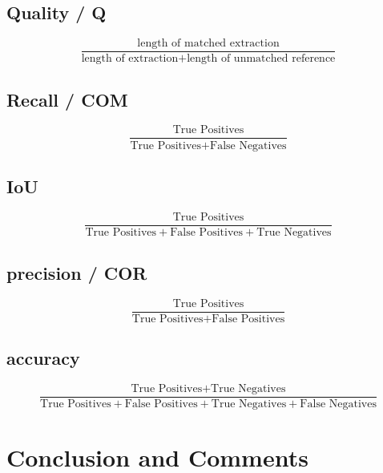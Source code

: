 \documentclass[conference]{IEEEtran}
\begin{document}
\subsection{Quality / Q}
\begin{equation}
    \frac{\text{length of matched extraction}}
    {\text{length of extraction} + \text{length of unmatched reference}}
    \label{eq:Quality}
\end{equation}

\subsection{Recall / COM}
\begin{equation}
    \frac{\text{True Positives}}
    {\text{True Positives} + \text{False Negatives}}
    \label{eq:Recall}
\end{equation}

\subsection{IoU}
\begin{equation}
    \frac{\text{True Positives}}
    {\text{True Positives} + \text{False Positives} + \text{True Negatives}}
    \label{eq:IoU}
\end{equation}

\subsection{precision / COR}
\begin{equation}
    \frac{\text{True Positives}}
    {\text{True Positives} + \text{False Positives}}
    \label{eq:precision}
\end{equation}

\subsection{accuracy}
\begin{equation}
    \frac{\text{True Positives} + \text{True Negatives}}
    {\text{True Positives} + \text{False Positives} + \text{True Negatives} + \text{False Negatives}}
    \label{eq:accuracy}
\end{equation}

\section{Conclusion and Comments}
\end{document}
